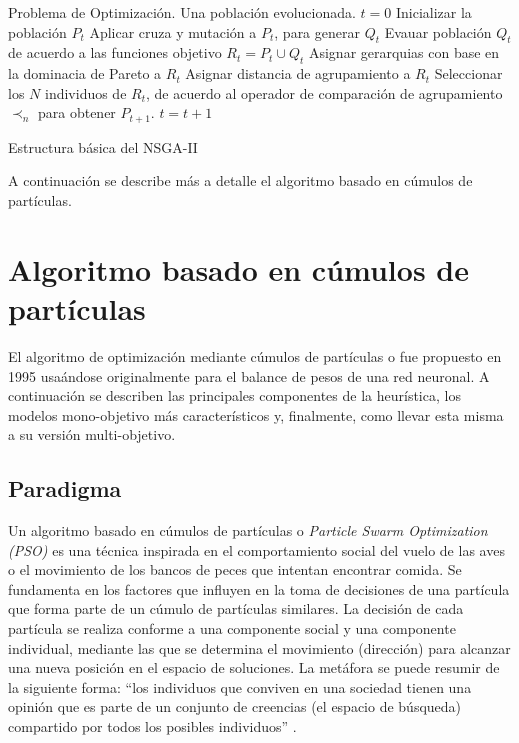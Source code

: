 \begin{itemize}
  
  \begin{algorithm}
      \begin{algorithmic}[1]			
	\REQUIRE Problema de Optimizaci\'on.
	\ENSURE Una poblaci\'on evolucionada.
	\STATE $t=0$
	\STATE Inicializar la poblaci\'on $P_t$
	    \STATE Aplicar cruza y mutaci\'on a $P_t$, para generar $Q_t$
	    \STATE Evauar poblaci\'on $Q_t$ de acuerdo a las funciones objetivo
	    \STATE $R_t = P_t \cup Q_t$
	    \STATE Asignar gerarquias con base en la dominacia de Pareto a $R_t$
	    \STATE Asignar distancia de agrupamiento a $R_t$
	    \STATE Seleccionar los $N$ individuos de $R_t$, de acuerdo al operador de comparaci\'on de agrupamiento
	    $\prec_n$ para obtener $P_{t+1}$.
	    \STATE $t = t +1$
	\ENDWHILE
      \end{algorithmic}
  \caption{Estructura b\'asica del NSGA-II}
  \label{alg:NSGA-II}
  \end{algorithm}

  
  \end{itemize}
  A continuaci\'on se describe m\'as a detalle el algoritmo basado en c\'umulos de part\'iculas.
      
\section{Algoritmo basado en c\'umulos de part\'iculas}

  El algoritmo de optimizaci\'on mediante c\'umulos de part\'iculas o fue propuesto en 1995 usa\'andose originalmente
  para el balance de pesos de una red neuronal. A continuaci\'on se describen las principales componentes de la heur\'istica, 
  los modelos mono-objetivo m\'as caracter\'isticos y, finalmente, como llevar esta misma a su versi\'on multi-objetivo.

  \subsection{Paradigma}
  
  Un algoritmo basado en c\'umulos de part\'iculas o \textit{Particle Swarm Optimization (PSO)} es una t\'ecnica inspirada en el 
  comportamiento social del vuelo de las aves o el movimiento de los bancos de peces que intentan encontrar comida. Se fundamenta 
  en los factores que influyen en la toma de decisiones de una part\'icula que forma parte de un c\'umulo de part\'iculas similares. 
  La decisi\'on de cada part\'icula se realiza conforme a una componente social y una componente individual, mediante las que se 
  determina el movimiento (direcci\'on) para alcanzar una nueva posici\'on en el espacio de soluciones. La met\'afora se puede resumir 
  de la siguiente forma: ``los individuos que conviven en una sociedad tienen una opini\'on que es parte de un conjunto de creencias 
  (el espacio de b\'usqueda) compartido por todos los posibles individuos'' \cite{JKennedySI}. 
  
